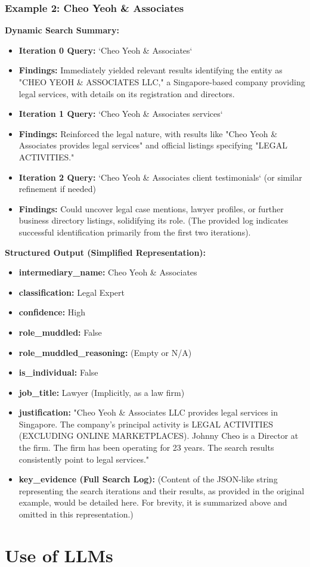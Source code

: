 \subsubsection*{Example 2: Cheo Yeoh \& Associates}
\textbf{Dynamic Search Summary:}
\begin{itemize}
    \item \textbf{Iteration 0 Query:} `Cheo Yeoh \& Associates`
    \item \textbf{Findings:} Immediately yielded relevant results identifying the entity as "CHEO YEOH \& ASSOCIATES LLC," a Singapore-based company providing legal services, with details on its registration and directors.
    \item \textbf{Iteration 1 Query:} `Cheo Yeoh \& Associates services`
    \item \textbf{Findings:} Reinforced the legal nature, with results like "Cheo Yeoh \& Associates provides legal services" and official listings specifying "LEGAL ACTIVITIES."
    \item \textbf{Iteration 2 Query:} `Cheo Yeoh \& Associates client testimonials` (or similar refinement if needed)
    \item \textbf{Findings:} Could uncover legal case mentions, lawyer profiles, or further business directory listings, solidifying its role. (The provided log indicates successful identification primarily from the first two iterations).
\end{itemize}

\textbf{Structured Output (Simplified Representation):}
\begin{itemize}
    \item \textbf{intermediary\_name:} Cheo Yeoh \& Associates
    \item \textbf{classification:} Legal Expert
    \item \textbf{confidence:} High
    \item \textbf{role\_muddled:} False
    \item \textbf{role\_muddled\_reasoning:} (Empty or N/A)
    \item \textbf{is\_individual:} False
    \item \textbf{job\_title:} Lawyer (Implicitly, as a law firm)
    \item \textbf{justification:} "Cheo Yeoh \& Associates LLC provides legal services in Singapore. The company's principal activity is LEGAL ACTIVITIES (EXCLUDING ONLINE MARKETPLACES). Johnny Cheo is a Director at the firm. The firm has been operating for 23 years. The search results consistently point to legal services."
    \item \textbf{key\_evidence (Full Search Log):} (Content of the JSON-like string representing the search iterations and their results, as provided in the original example, would be detailed here. For brevity, it is summarized above and omitted in this representation.)
\end{itemize}\section{Use of LLMs}

